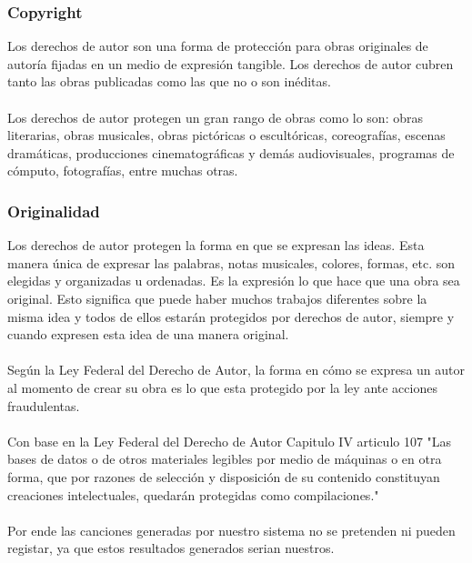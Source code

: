 \documentclass[12pt, a4paper, titlepage]{report}
\begin{document}
			\subsubsection*{Copyright}
				Los derechos de autor son una forma de protección para obras originales de autoría fijadas en un medio de expresión tangible. Los derechos de autor cubren tanto las obras publicadas como las que no o son inéditas.\cite{refCopyright}\\\\
				Los derechos de autor protegen un gran rango de obras como lo son: obras literarias, obras musicales, obras pictóricas o escultóricas, coreografías, escenas dramáticas, producciones cinematográficas y demás audiovisuales, programas de cómputo, fotografías, entre muchas otras.
				\subsubsection*{Originalidad}
				Los derechos de autor protegen la forma en que se expresan las ideas. Esta manera única de expresar las palabras, notas musicales, colores, formas, etc. son elegidas y organizadas u ordenadas. Es la expresión lo que hace que una obra sea original. Esto significa que puede haber muchos trabajos diferentes sobre la misma idea y todos de ellos estarán protegidos por derechos de autor, siempre y cuando expresen esta idea de una manera original.\cite{refOriginalidadWipo}\\\\
				Según la Ley Federal del Derecho de Autor, la forma en cómo se expresa un autor al momento de crear su obra es lo que esta protegido por la ley ante acciones fraudulentas.\cite{refOriginalidadLFDA}\\\\
				Con base en la Ley Federal del Derecho de Autor Capitulo IV articulo 107 "Las bases de datos o de otros materiales legibles por medio de máquinas o en otra forma, que por razones de selección y disposición de su contenido constituyan creaciones intelectuales, quedarán protegidas como compilaciones."\cite{refOriginalidadLFDA}\\\\
				Por ende las canciones generadas por nuestro sistema no se pretenden ni pueden registar, ya que estos resultados generados serian nuestros.
\newpage
\end{document}
